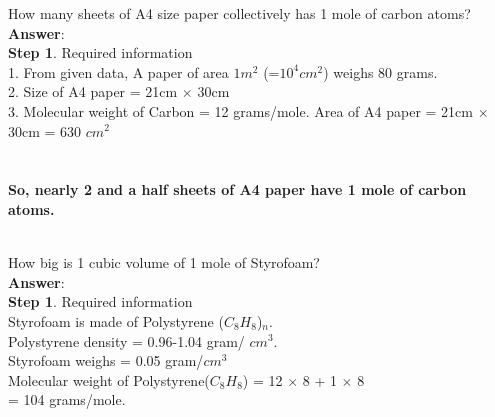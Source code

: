 \documentclass[11pt]{exam}
\begin{document}
\begin{questions}
\question
\label{Q4:A4 paper}

How many sheets of A4 size paper collectively has 1 mole of carbon atoms?\\
\textbf{Answer}: \\ 
\textbf{Step 1}. Required information\\ 
1. From given data, A paper of area $1m^{2}$ (=$10^{4}cm^{2}$) weighs 80 grams. \\ 
2. Size of A4 paper = 21cm $\times$ 30cm \\ 
3. Molecular weight of Carbon = 12 grams/mole.
 Area of A4 paper = 21cm $\times$ 30cm = 630 $cm^{2}$\\ 

 \\ \\
\textbf{So, nearly 2 and a half sheets of A4 paper have 1 mole of carbon atoms.} \\ \\



\question
\label{Q5:Styrofoam}

How big is 1 cubic volume of 1 mole of Styrofoam?\\
\textbf{Answer}: \\
\textbf{Step 1}. Required information \\
Styrofoam is made of Polystyrene ($C_{8}H_{8}$)$_{n}$. \\
Polystyrene density = 0.96-1.04 gram/ $cm^{3}$.\\
Styrofoam weighs = 0.05 gram/$cm^{3}$ \\
Molecular weight of Polystyrene($C_{8}H_{8}$) = 12 $\times$ 8 + 1 $\times$ 8\\ = 104 grams/mole.\\ 

\fbox{\begin{minipage}{38em}
 

\end{minipage}}
\end{questions}
\end{document}
